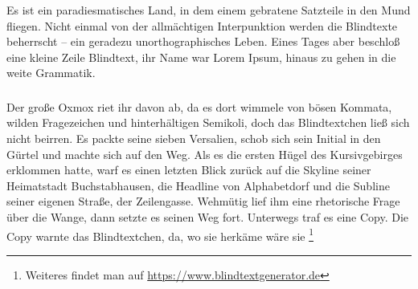 \subsubsection{}
Es ist ein paradiesmatisches Land, in dem einem gebratene Satzteile in den Mund fliegen. 
Nicht einmal von der allmächtigen Interpunktion werden die Blindtexte beherrscht -- ein geradezu unorthographisches Leben. 
Eines Tages aber beschloß eine kleine Zeile Blindtext, ihr Name war Lorem Ipsum, hinaus zu gehen in die weite Grammatik. 
\subsubsection{}
Der große Oxmox riet ihr davon ab, da es dort wimmele von bösen Kommata, wilden Fragezeichen und hinterhältigen Semikoli, doch das Blindtextchen ließ sich nicht beirren. 
Es packte seine sieben Versalien, schob sich sein Initial in den Gürtel und machte sich auf den Weg. 
Als es die ersten Hügel des Kursivgebirges erklommen hatte, warf es einen letzten Blick zurück auf die Skyline seiner Heimatstadt Buchstabhausen, die Headline von Alphabetdorf und die Subline seiner eigenen Straße, der Zeilengasse. 
Wehmütig lief ihm eine rhetorische Frage über die Wange, dann setzte es seinen Weg fort. 
Unterwegs traf es eine Copy. Die Copy warnte das Blindtextchen, da, wo sie herkäme wäre sie%
\footnote{Weiteres findet man auf \href{https://www.blindtextgenerator.de}{https://www.blindtextgenerator.de}}

